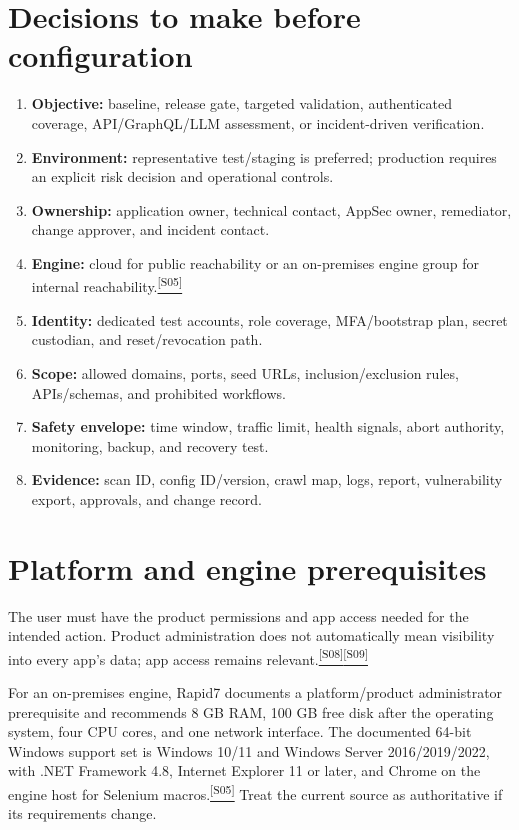 \documentclass[11pt,letterpaper,oneside]{scrreprt}
\newcommand{\src}[1]{\hyperref[src:#1]{\textsuperscript{\color{R7Orange}[#1]}}}
\begin{document}
\section{Decisions to make before configuration}
\begin{enumerate}
  \item \textbf{Objective:} baseline, release gate, targeted validation, authenticated coverage, API/GraphQL/LLM assessment, or incident-driven verification.
  \item \textbf{Environment:} representative test/staging is preferred; production requires an explicit risk decision and operational controls.
  \item \textbf{Ownership:} application owner, technical contact, AppSec owner, remediator, change approver, and incident contact.
  \item \textbf{Engine:} cloud for public reachability or an on-premises engine group for internal reachability.\src{S05}
  \item \textbf{Identity:} dedicated test accounts, role coverage, MFA/bootstrap plan, secret custodian, and reset/revocation path.
  \item \textbf{Scope:} allowed domains, ports, seed URLs, inclusion/exclusion rules, APIs/schemas, and prohibited workflows.
  \item \textbf{Safety envelope:} time window, traffic limit, health signals, abort authority, monitoring, backup, and recovery test.
  \item \textbf{Evidence:} scan ID, config ID/version, crawl map, logs, report, vulnerability export, approvals, and change record.
\end{enumerate}

\section{Platform and engine prerequisites}
The user must have the product permissions and app access needed for the intended action. Product administration does not automatically mean visibility into every app's data; app access remains relevant.\src{S08}\src{S09}

For an on-premises engine, Rapid7 documents a platform/product administrator prerequisite and recommends 8 GB RAM, 100 GB free disk after the operating system, four CPU cores, and one network interface. The documented 64-bit Windows support set is Windows 10/11 and Windows Server 2016/2019/2022, with .NET Framework 4.8, Internet Explorer 11 or later, and Chrome on the engine host for Selenium macros.\src{S05} Treat the current source as authoritative if its requirements change.
\end{document}
